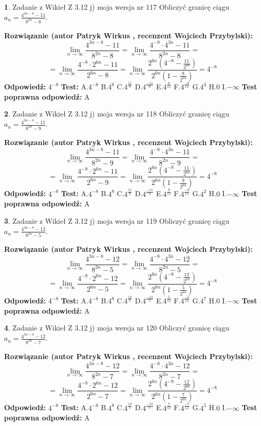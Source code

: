 \documentclass[12pt, a4paper]{article}
\theoremstyle{definition} %
\newtheorem{zad}{}
\newcommand{\zadStart}[1]{\begin{zad}#1\newline}
\newcommand{\zadStop}{\end{zad}}
\newcommand{\rozwStart}[2]{\noindent \textbf{Rozwiązanie (autor #1 , recenzent #2): }\newline}
\newcommand{\rozwStop}{\newline}
\newcommand{\odpStart}{\noindent \textbf{Odpowiedź:}\newline}
\newcommand{\odpStop}{\newline}
\newcommand{\testStart}{\noindent \textbf{Test:}\newline}
\newcommand{\testStop}{\newline}
\newcommand{\kluczStart}{\noindent \textbf{Test poprawna odpowiedź:}\newline}
\newcommand{\kluczStop}{\newline}
\begin{document}
\zadStart{Zadanie z Wikieł Z 3.12 j) moja wersja nr 117}
Obliczyć granicę ciągu $a_{n}=\frac{4^{3n-8}-11}{8^{2n}-8}$.
\zadStop
\rozwStart{Patryk Wirkus}{Wojciech Przybylski}
$$\lim\limits_{n\to\infty}\frac{4^{3n-8}-11}{8^{2n}-8}= \lim\limits_{n\to\infty}\frac{4^{-8} \cdot 4^{3n}-11}{8^{2n}-8}=$$
$$= \lim\limits_{n\to\infty}\frac{4^{-8} \cdot 2^{6n}-11}{2^{6n}-8}= \lim\limits_{n\to\infty}\frac{2^{6n}(4^{-8} - \frac{11}{2^{6n}})}{2^{6n}(1-\frac{8}{2^{6n}})}= 4^{-8}$$
\rozwStop
\odpStart
$4^{-8}$
\odpStop
\testStart
A.$4^{-8}$
B.$4^{8}$
C.$4^{\frac{11}{8}}$
D.$4^{\frac{-11}{8}}$
E.$4^{\frac{8}{11}}$
F.$4^{\frac{-8}{11}}$
G.$4^{3}$
H.$0$
I.$-\infty$
\testStop
\kluczStart
A
\kluczStop



\zadStart{Zadanie z Wikieł Z 3.12 j) moja wersja nr 118}
Obliczyć granicę ciągu $a_{n}=\frac{4^{3n-8}-11}{8^{2n}-9}$.
\zadStop
\rozwStart{Patryk Wirkus}{Wojciech Przybylski}
$$\lim\limits_{n\to\infty}\frac{4^{3n-8}-11}{8^{2n}-9}= \lim\limits_{n\to\infty}\frac{4^{-8} \cdot 4^{3n}-11}{8^{2n}-9}=$$
$$= \lim\limits_{n\to\infty}\frac{4^{-8} \cdot 2^{6n}-11}{2^{6n}-9}= \lim\limits_{n\to\infty}\frac{2^{6n}(4^{-8} - \frac{11}{2^{6n}})}{2^{6n}(1-\frac{9}{2^{6n}})}= 4^{-8}$$
\rozwStop
\odpStart
$4^{-8}$
\odpStop
\testStart
A.$4^{-8}$
B.$4^{8}$
C.$4^{\frac{11}{9}}$
D.$4^{\frac{-11}{9}}$
E.$4^{\frac{9}{11}}$
F.$4^{\frac{-9}{11}}$
G.$4^{2}$
H.$0$
I.$-\infty$
\testStop
\kluczStart
A
\kluczStop



\zadStart{Zadanie z Wikieł Z 3.12 j) moja wersja nr 119}
Obliczyć granicę ciągu $a_{n}=\frac{4^{3n-8}-12}{8^{2n}-5}$.
\zadStop
\rozwStart{Patryk Wirkus}{Wojciech Przybylski}
$$\lim\limits_{n\to\infty}\frac{4^{3n-8}-12}{8^{2n}-5}= \lim\limits_{n\to\infty}\frac{4^{-8} \cdot 4^{3n}-12}{8^{2n}-5}=$$
$$= \lim\limits_{n\to\infty}\frac{4^{-8} \cdot 2^{6n}-12}{2^{6n}-5}= \lim\limits_{n\to\infty}\frac{2^{6n}(4^{-8} - \frac{12}{2^{6n}})}{2^{6n}(1-\frac{5}{2^{6n}})}= 4^{-8}$$
\rozwStop
\odpStart
$4^{-8}$
\odpStop
\testStart
A.$4^{-8}$
B.$4^{8}$
C.$4^{\frac{12}{5}}$
D.$4^{\frac{-12}{5}}$
E.$4^{\frac{5}{12}}$
F.$4^{\frac{-5}{12}}$
G.$4^{7}$
H.$0$
I.$-\infty$
\testStop
\kluczStart
A
\kluczStop



\zadStart{Zadanie z Wikieł Z 3.12 j) moja wersja nr 120}
Obliczyć granicę ciągu $a_{n}=\frac{4^{3n-8}-12}{8^{2n}-7}$.
\zadStop
\rozwStart{Patryk Wirkus}{Wojciech Przybylski}
$$\lim\limits_{n\to\infty}\frac{4^{3n-8}-12}{8^{2n}-7}= \lim\limits_{n\to\infty}\frac{4^{-8} \cdot 4^{3n}-12}{8^{2n}-7}=$$
$$= \lim\limits_{n\to\infty}\frac{4^{-8} \cdot 2^{6n}-12}{2^{6n}-7}= \lim\limits_{n\to\infty}\frac{2^{6n}(4^{-8} - \frac{12}{2^{6n}})}{2^{6n}(1-\frac{7}{2^{6n}})}= 4^{-8}$$
\rozwStop
\odpStart
$4^{-8}$
\odpStop
\testStart
A.$4^{-8}$
B.$4^{8}$
C.$4^{\frac{12}{7}}$
D.$4^{\frac{-12}{7}}$
E.$4^{\frac{7}{12}}$
F.$4^{\frac{-7}{12}}$
G.$4^{5}$
H.$0$
I.$-\infty$
\testStop
\kluczStart
A
\kluczStop
\end{document}
